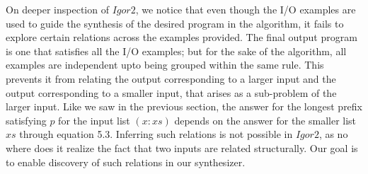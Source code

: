 On deeper inspection of $Igor2$, we notice that even though the I/O examples are used to guide the synthesis of the desired program in the algorithm, it fails to explore certain relations across the examples provided. The final output program is one that satisfies all the I/O examples; but for the sake of the algorithm, all examples are independent upto being grouped within the same rule. This prevents it from relating the output corresponding to a larger input and the output corresponding to a smaller input, that arises as a sub-problem of the larger input. Like we saw in the previous section, the answer for the longest prefix satisfying $p$ for the input list $(x : xs)$ depends on the answer for the smaller list $xs$ through equation 5.3. Inferring such relations is not possible in $Igor2$, as no where does it realize the fact that two inputs are related structurally. Our goal is to enable discovery of such relations in our synthesizer.